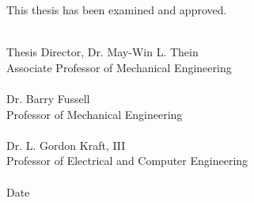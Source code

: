 \thispagestyle{empty}
\noindent This thesis has been examined and approved.
\vspace*{2.5cm}

\begin{minipage}{0.2\textwidth}
        \begin{flushleft}
        \end{flushleft}
    \end{minipage}
\begin{minipage}{0.8\textwidth}

        \begin{flushleft}
            \underline{\hspace{10cm}} \\
            Thesis Director, Dr. May-Win L. Thein\\
            Associate Professor of Mechanical Engineering\\
            \vspace{1.5cm}
            \underline{\hspace{10cm}} \\
            Dr. Barry Fussell\\
            Professor of Mechanical Engineering\\
            \vspace{1.5cm}
            \underline{\hspace{10cm}} \\
            Dr. L. Gordon Kraft, III\\
            Professor of Electrical and Computer Engineering\\
            \vspace{2cm}
            \hspace{3cm}\underline{\hspace{7cm}} \\
            \hspace{3cm}Date
        \end{flushleft}
\end{minipage}\\[1cm]

\pagebreak